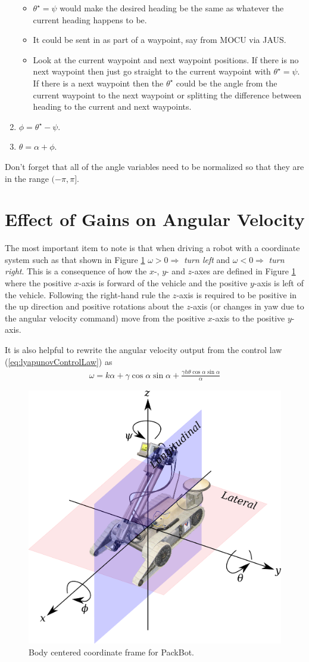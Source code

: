 \documentclass[12pt]{article}
\begin{document}
\begin{enumerate}
\begin{itemize}
\item $\theta^\star=\psi$ would make the desired heading be the same as whatever the current heading happens to be.
\item It could be sent in as part of a waypoint, say from MOCU via JAUS.
\item Look at the current waypoint and next waypoint positions. If there is no next waypoint then just go straight to the current waypoint with $\theta^\star=\psi$. If there is a next waypoint then the $\theta^\star$ could be the angle from the current waypoint to the next waypoint or splitting the difference between heading to the current and next waypoints.
\end{itemize}
\item $\phi=\theta^\star-\psi$.
\item $\theta=\alpha + \phi$.
\end{enumerate}
Don't forget that all of the angle variables need to be normalized so that they are in the range $(-\pi,\pi]$.

\section{Effect of Gains on Angular Velocity}
The most important item to note is that when driving a robot with a coordinate system such as that shown in Figure \ref{fig:packbotaxes} $\omega>0\Rightarrow$ \textit{turn left} and $\omega<0\Rightarrow$ \textit{turn right}. This is a consequence of how the $x$-, $y$- and $z$-axes are defined in Figure \ref{fig:packbotaxes} where the positive $x$-axis is forward of the vehicle and the positive $y$-axis is left of the vehicle. Following the right-hand rule the $z$-axis is required to be positive in the up direction and positive rotations about the $z$-axis (or changes in yaw due to the angular velocity command) move from the positive $x$-axis to the positive $y$-axis.

It is also helpful to rewrite the angular velocity output from the control law (\ref{eq:lyapunovControlLaw}) as
\begin{align*}
\omega = k\alpha + \gamma\cos\alpha\sin\alpha + \frac{\gamma h\theta\cos\alpha\sin\alpha}{\alpha}
\end{align*}

\begin{figure}[ht!]
	\centering
	\includegraphics[width=.5\textwidth]{images/packbotaxes}
	\caption{Body centered coordinate frame for PackBot.}
	\label{fig:packbotaxes}
\end{figure}
\end{document}
